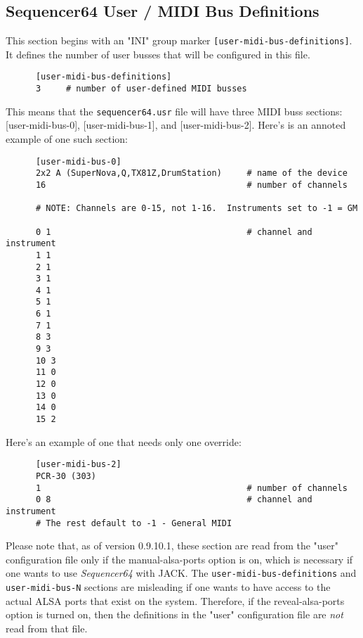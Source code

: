 \subsection{Sequencer64 User / MIDI Bus Definitions}
\label{subsec:seq64_usr_file_midi_bus_definitions}

   This section begins with an
   "INI" group marker \texttt{[user-midi-bus-definitions]}.
   It defines the number of user busses that will be configured in this file.

   \begin{verbatim}
      [user-midi-bus-definitions]
      3     # number of user-defined MIDI busses
   \end{verbatim}

   This means that the \texttt{sequencer64.usr} file will have three MIDI buss
   sections: [user-midi-bus-0], [user-midi-bus-1], and [user-midi-bus-2].
   Here's is an annoted example of one such section:

   \begin{verbatim}
      [user-midi-bus-0]
      2x2 A (SuperNova,Q,TX81Z,DrumStation)     # name of the device
      16                                        # number of channels

      # NOTE: Channels are 0-15, not 1-16.  Instruments set to -1 = GM

      0 1                                       # channel and instrument
      1 1 
      2 1
      3 1
      4 1
      5 1
      6 1
      7 1
      8 3
      9 3
      10 3
      11 0
      12 0
      13 0
      14 0
      15 2
   \end{verbatim}

   Here's an example of one that needs only one override:

   \begin{verbatim}
      [user-midi-bus-2]
      PCR-30 (303)
      1                                         # number of channels
      0 8                                       # channel and instrument
      # The rest default to -1 - General MIDI
   \end{verbatim}

   Please note that, as of version 0.9.10.1, these section are read from the
   "user" configuration file only if
   the manual-alsa-ports option is on, which is necessary if one
   wants to use \textsl{Sequencer64} with JACK.
   The \texttt{user-midi-bus-definitions} and \texttt{user-midi-bus-N} sections
   are misleading if one wants to have access to the
   actual ALSA ports that exist on the system.
   Therefore, if the reveal-alsa-ports option is turned on, then the
   definitions in the "user" configuration file are \textsl{not} read from that
   file.

